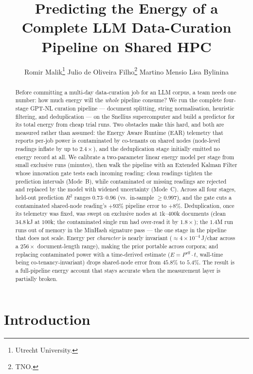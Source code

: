 \documentclass{article}
\title{Predicting the Energy of a Complete LLM Data-Curation Pipeline on Shared HPC}
\author{
  Romir Malik\thanks{Utrecht University.} \quad
  Julio de Oliveira Filho\thanks{TNO.} \quad
  Martino Mensio\footnotemark[2] \quad
  Lisa Bylinina\footnotemark[1]
}
\begin{document}
\maketitle

\begin{abstract}
Before committing a multi-day data-curation job for an LLM corpus, a team needs one number: how much energy will the \emph{whole} pipeline consume? We run the complete four-stage GPT-NL curation pipeline --- document splitting, string normalisation, heuristic filtering, and deduplication --- on the Snellius supercomputer and build a predictor for its total energy from cheap trial runs. Two obstacles make this hard, and both are measured rather than assumed: the Energy Aware Runtime (EAR) telemetry that reports per-job power is contaminated by co-tenants on shared nodes (node-level readings inflate by up to $2.4\times$), and the deduplication stage initially emitted no energy record at all.
We calibrate a two-parameter linear energy model per stage from small exclusive runs (minutes), then walk the pipeline with an Extended Kalman Filter whose innovation gate tests each incoming reading: clean readings tighten the prediction intervals (Mode~B), while contaminated or missing readings are rejected and replaced by the model with widened uncertainty (Mode~C). Across all four stages, held-out prediction $R^2$ ranges $0.73$--$0.96$ (vs.\ in-sample ${\ge}0.997$), and the gate cuts a contaminated shared-node reading's $+93\%$ pipeline error to $+8\%$. Deduplication, once its telemetry was fixed, was swept on exclusive nodes at $1$k--$400$k documents (clean $34.8$\,kJ at $100$k; the contaminated single run had over-read it by $1.8\times$); the $1.4$M run runs out of memory in the MinHash signature pass --- the one stage in the pipeline that does not scale. Energy per \emph{character} is nearly invariant (${\approx}4{\times}10^{-4}$\,J/char across a $256\times$ document-length range), making the prior portable across corpora; and replacing contaminated power with a time-derived estimate ($E = P^{\mathrm{eff}}\cdot t$, wall-time being co-tenancy-invariant) drops shared-node error from $45.8\%$ to $5.4\%$. The result is a full-pipeline energy account that stays accurate when the measurement layer is partially broken.
\end{abstract}

\section{Introduction}
\end{document}
